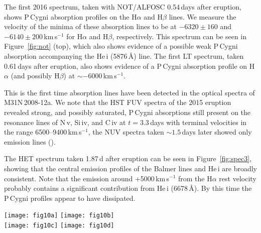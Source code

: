 \documentclass[twocolumn,tighten]{aastex6}
\def\novak{{M31N\,2008-12a}}
\newcommand{\hstspec}{\citetalias{2017ApJ...847...35D}}
\begin{document}
The first 2016 spectrum, taken with NOT/ALFOSC 0.54\,days after eruption, shows P\,Cygni absorption profiles on the H$\alpha$ and H$\beta$ lines. We measure the velocity of the minima of these absorption lines to be at $-6320\pm160$ and $-6140\pm200$\,km\,s$^{-1}$ for H$\alpha$ and H$\beta$, respectively. This spectrum can be seen in Figure~\ref{fig:not} (top), which also shows evidence of a possible weak P\,Cygni absorption accompanying the He\,{\sc i} (5876\,\AA) line.  The first LT spectrum, taken 0.61\,days after eruption, also shows evidence of a P\,Cygni absorption profile on H$\alpha$ (and possibly H$\beta$) at $\sim-6000$\,km\,s$^{-1}$. 

This is the first time absorption lines have been detected in the optical spectra of \novak. We note that the HST FUV spectra of the 2015 eruption revealed strong, and possibly saturated, P\,Cygni absorptions still present on the resonance lines of N\,{\sc v}, Si\,{\sc iv}, and C\,{\sc iv} at $t=3.3$\,days with terminal velocities in the range 6500--9400\,km\,s$^{-1}$, the NUV spectra taken $\sim1.5$\,days later showed only emission lines (\hstspec). 

The HET spectrum taken 1.87\,d after eruption can be seen in Figure~\ref{fig:spec3}, showing that the central emission profiles of the Balmer lines and He\,{\sc i} are broadly consistent. Note that the emission around +5000\,km\,s$^{-1}$ from the H$\alpha$ rest velocity probably contains a significant contribution from He\,{\sc i} (6678\,\AA). By this time the P\,Cygni profiles appear to have dissipated. 

\begin{figure*}
\begin{center}
\texttt{[image: fig10a]}\hfill
\texttt{[image: fig10b]}\\
\texttt{[image: fig10c]}\hfill
\texttt{[image: fig10d]}
\end{center}
\caption{\textbf{Top left}: HET spectrum at day 1.87, showing the similar line structures of H$\alpha$, H$\beta$ and He\,{\sc i} (5876\,\AA). {\textbf{Top right}}: LT spectra comparing the high-velocity material at day-2.84 of the 2015 eruption to day-2.58 of the 2016 eruption. These are normalized to the lower velocity component peak. \textbf{Bottom left}: FWHM velocity evolution of the H$\alpha$ profile during the 2016 eruption (black), compared to previous eruptions (red).  The gray dashed line is a power law of an index of $-1/3$ ($\chi^2_{/\mathrm{dof}}=3.7$; Phase II of shocked remnant development) and the solid black line is the best-fit power law with an index of $-0.26\pm$0.04 ($\chi^2_{/\mathrm{dof}}= 3.6$). \textbf{Bottom right:} comparison between the H$\alpha$ line profile 0.54\,days after the 2016 eruption (black) and the N\,{\sc v} (1240\,\AA) profile 3.32\,days after the 2015 eruption (gray; see \hstspec). Note that the N\,{\sc v} profile has been shifted 500\,km\,s$^{-1}$ blueward with respect to H$\alpha$.\label{fig:spec3}}
\end{figure*}
\end{document}
